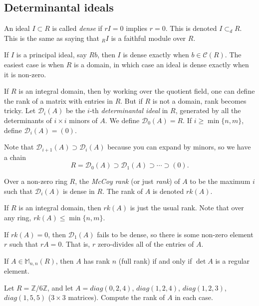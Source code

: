 \subsection{Determinantal ideals}
\begin{definition}
   An ideal $I\subset R$ is called \emph{dense} if $rI=0$ implies $r=0$.
   This is denoted $I\subset_d R$. This is the same as saying that ${}_RI$ is a
   faithful module over $R$.
 \end{definition}
 If $I$ is a principal ideal, say $Rb$, then $I$ is dense exactly when $b\in \mathcal{C}(R)$. The
 easiest case is when $R$ is a domain, in which case an ideal is dense exactly when it is
 non-zero.

 If $R$ is an integral domain, then by working over the quotient field, one can define
 the rank of a matrix with entries in $R$. But if $R$ is not a domain, rank becomes
 tricky. Let $\mathcal{D}_i(A)$ be the $i$-th \emph{determinantal ideal} in $R$, generated by all
 the determinants of $i\times i$ minors of $A$. We define $\mathcal{D}_0(A)=R$. If $i\ge
 \min\{n,m\}$, define $\mathcal{D}_i(A)=(0)$.

 Note that $\mathcal{D}_{i+1}(A)\supset \mathcal{D}_i(A)$ because you can expand by minors, so we have a
 chain
 \[
    R=\mathcal{D}_0(A)\supset \mathcal{D}_1(A)\supset \cdots \supset (0).
 \]
 \begin{definition}
   Over a non-zero ring $R$, the \emph{McCoy rank} (or just \emph{rank}) of $A$ to be
   the maximum $i$ such that $\mathcal{D}_i(A)$ is dense in $R$. The rank of $A$ is denoted
   $rk(A)$.
 \end{definition}
 If $R$ is an integral domain, then $rk(A)$ is just the usual rank. Note that over any
 ring, $rk(A)\le \min\{n,m\}$.

 If $rk(A)=0$, then $\mathcal{D}_1(A)$ fails to be dense, so there is some non-zero element $r$
 such that $rA=0$. That is, $r$ zero-divides all of the entries of $A$.

 If $A\in \mathbb{M}_{n,n}(R)$, then $A$ has rank $n$ (full rank) if and only if $\det A$ is a
 regular element.

 \begin{exercise}
   Let $R=\mathbb{Z}/6\mathbb{Z} $, and let $A=diag(0,2,4)$, $diag(1,2,4)$, $diag(1,2,3)$, $diag(1,5,5)$
   ($3\times 3$ matrices). Compute the rank of $A$ in each case.
 \end{exercise}
 \begin{solution}
 \end{solution}
